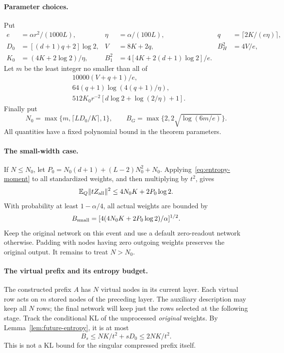 \paragraph{Parameter choices.}
Put
\begin{align*}
 e&=\alpha r^2/(1000L),&\eta&=\alpha/(100L),&
 q&=\lceil2K/(e\eta)\rceil,\\
 D_0&=[(d+1)q+2]\log2,&V&=8K+2q,&B_H^2&=4V/e,\\
 K_0&=(4K+2\log2)/\eta,&
 B_1^2&=4[4K+2(d+1)\log2]/e.
\end{align*}
Let $m$ be the least integer no smaller than all of
\begin{align}
 &10000(V+q+1)/e,\nonumber\\
 &64(q+1)\log(4(q+1)/\eta),\label{eq:new-m}\\
 &512K_0r^{-2}[d\log2+\log(2/\eta)+1].\nonumber
\end{align}
Finally put
\[
 N_0=\max\{m,\lceil LD_0/K\rceil,1\},\qquad
 B_G=\max\{2,2\sqrt{\log(6m/e)}\}.
\]
All quantities have a fixed polynomial bound in the theorem parameters.
\paragraph{The small-width case.}
If $N\le N_0$, let
$P_0=N_0(d+1)+(L-2)N_0^2+N_0$. Applying~\eqref{eq:entropy-moment} to all
standardized weights, and then multiplying by $t^2$, gives
\[
 \mathbb E_Q\|tZ_{\rm all}\|^2\le4N_0K+2P_0\log2.
\]
With probability at least $1-\alpha/4$, all actual weights are bounded by
\[
 B_{\rm small}=[4(4N_0K+2P_0\log2)/\alpha]^{1/2}.
\]
Keep the original network on this event and use a default zero-readout network otherwise.
Padding with nodes having zero outgoing weights preserves the original output.
It remains to treat $N>N_0$.

\paragraph{The virtual prefix and its entropy budget.}
The constructed prefix $A$ has $N$ virtual nodes in its current layer. Each
virtual row acts on $m$ stored nodes of the preceding layer. The auxiliary
description may keep all $N$ rows; the final network will keep just the rows
selected at the following stage. Track the conditional KL of the unprocessed
\emph{original} weights. By Lemma~\ref{lem:future-entropy}, it is at most
\[
 B_s\le NK/t^2+sD_0\le2NK/t^2.                              \tag{*}
\]
This is not a KL bound for the singular compressed prefix itself.

